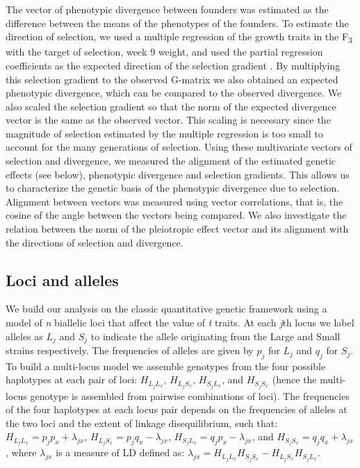\begin{refsection}
The vector of phenotypic divergence between founders was estimated as
the difference between the means of the phenotypes of the founders. To
estimate the direction of selection, we used a multiple regression of
the growth traits in the F\textsubscript{3} with the target of
selection, week 9 weight, and used the partial regression coefficients
as the expected direction of the selection gradient \parencite{Lande1983-ez}. By multiplying this
selection gradient to the observed G-matrix we also obtained an expected
phenotypic divergence, which can be compared to the observed divergence.
We also scaled the selection gradient so that the norm of the expected
divergence vector is the same as the observed vector. This scaling is
necessary since the magnitude of selection estimated by the multiple
regression is too small to account for the many generations of
selection. Using these multivariate vectors of selection and divergence,
we measured the alignment of the estimated genetic effects (see below), phenotypic
divergence and selection gradients. This allows us to characterize the 
genetic basis of the phenotypic divergence due to selection. Alignment between vectors was measured
using vector correlations, that is, the cosine of the angle between the
vectors being compared. We also investigate the relation between the
norm of the pleiotropic effect vector and its alignment with the
directions of selection and divergence.

\subsection{Loci and alleles}

We build our analysis on the classic quantitative genetic framework
using a model of \emph{n} biallelic loci that affect the value of
\emph{t} traits. At each \emph{j}th locus we label alleles
as \(L_{j}\) and \(S_{j}\) to indicate the allele originating from the Large
and Small strains respectively. The frequencies of alleles are given
by \(p_{j}\) for \(L_{j}\) and \(q_{j}\) for \(S_{j}\). To build a multi-locus
model we assemble genotypes from the four possible haplotypes at each
pair of loci: \(H_{L_{j}L_{x}}\), \(H_{L_{j}S_{x}}\), \(H_{S_{j}L_{x}}\), and \(H_{S_{j}S_{x}}\) (hence
the multi-locus genotype is assembled from pairwise combinations of
loci). The frequencies of the four haplotypes at each locus pair depends
on the frequencies of alleles at the two loci and the extent of linkage
disequilibrium, such
that: \(H_{L_{j}L_{x}} = p_{j}p_{x} + \lambda_{jx}\), \(H_{L_{j}S_{x}} = p_{j}q_{x} - \lambda_{jx}\), \(H_{S_{j}L_{x}} = q_{j}p_{x} - \lambda_{jx}\), and \(H_{S_{j}S_{x}} = q_{j}q_{x} + \lambda_{jx}\), where \(\lambda_{jx}\) is a measure of LD defined as: \(\lambda_{jx} = H_{L_{j}L_{x}}H_{S_{j}S_{x}} - H_{L_{j}S_{x}}H_{S_{j}L_{x}}\).


\end{refsection}
